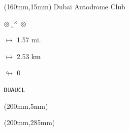 \begin{textblock*}{40mm}(160mm,15mm)%
Dubai Autodrome Club
\par $\circledcirc\llcorner^{\rightthreetimes}\circledcirc$
\Large
\par$\mapsto$ 1.57 mi.
\par$\mapsto$ 2.53 km
\par$\looparrowright$ 0
\par\hfill\tiny\tt DUAUCL\\
\end{textblock*}
\begin{textblock*}{20mm}(200mm,5mm)%
\fbox{\thepage}
\end{textblock*}
\begin{textblock*}{20mm}(200mm,285mm)%
\fbox{\thepage}
\end{textblock*}
\null\newpage

